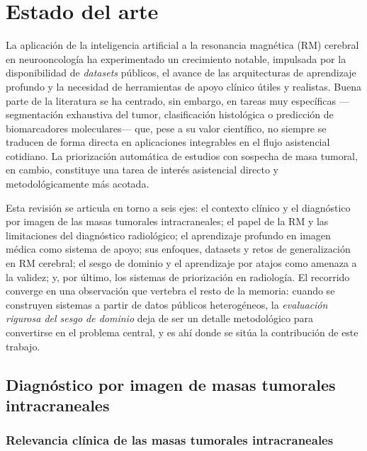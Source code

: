 \chapter{Estado del arte}

La aplicación de la inteligencia artificial a la resonancia magnética (RM)
cerebral en neurooncología ha experimentado un crecimiento notable, impulsada por
la disponibilidad de \emph{datasets} públicos, el avance de las arquitecturas de
aprendizaje profundo y la necesidad de herramientas de apoyo clínico útiles y
realistas. Buena parte de la literatura se ha centrado, sin embargo, en tareas
muy específicas ---segmentación exhaustiva del tumor, clasificación histológica o
predicción de biomarcadores moleculares--- que, pese a su valor científico, no
siempre se traducen de forma directa en aplicaciones integrables en el flujo
asistencial cotidiano. La priorización automática de estudios con sospecha de
masa tumoral, en cambio, constituye una tarea de interés asistencial directo y
metodológicamente más acotada.

Esta revisión se articula en torno a seis ejes: el contexto clínico y el
diagnóstico por imagen de las masas tumorales intracraneales; el papel de la RM y
las limitaciones del diagnóstico radiológico; el aprendizaje profundo en imagen
médica como sistema de apoyo; sus enfoques, datasets y retos de generalización en
RM cerebral; el sesgo de dominio y el aprendizaje por atajos como amenaza a la
validez; y, por último, los sistemas de priorización en radiología. El recorrido
converge en una observación que vertebra el resto de la memoria: cuando se
construyen sistemas a partir de datos públicos heterogéneos, la \emph{evaluación
rigurosa del sesgo de dominio} deja de ser un detalle metodológico para
convertirse en el problema central, y es ahí donde se sitúa la contribución de
este trabajo.

\section{Diagnóstico por imagen de masas tumorales intracraneales}

\subsection{Relevancia clínica de las masas tumorales intracraneales}

